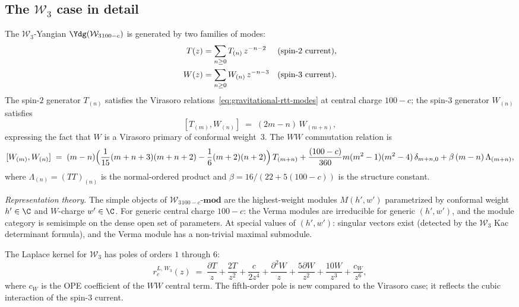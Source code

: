 \subsection{The $\mathcal{W}_3$ case in detail}

\begin{construction}
The $\mathcal{W}_3$-Yangian $\Ydg(\mathcal{W}_3{}_{100-c})$
is generated by two families of modes:
\begin{align}
T(z)&=\sum_{n\ge 0}T_{(n)}\,z^{-n-2}
 &&\text{(spin-$2$ current)}, \notag \\
W(z)&=\sum_{n\ge 0}W_{(n)}\,z^{-n-3}
 &&\text{(spin-$3$ current)}.
\end{align}
The spin-$2$ generator $T_{(n)}$ satisfies the Virasoro
relations~\eqref{eq:gravitational-rtt-modes} at central
charge $100-c$; the spin-$3$ generator $W_{(n)}$
satisfies
\begin{equation}
[T_{(m)},W_{(n)}]
\;=\;
(2m-n)\,W_{(m+n)},
\end{equation}
expressing the fact that $W$ is a Virasoro primary of
conformal weight~$3$. The $WW$ commutation relation is
\begin{equation}
[W_{(m)},W_{(n)}]
\;=\;
(m-n)\Bigl(
\frac{1}{15}(m+n+3)(m+n+2)
-\frac{1}{6}(m+2)(n+2)
\Bigr)\,T_{(m+n)}
+\frac{(100-c)}{360}m(m^2-1)(m^2-4)\,\delta_{m+n,0}
+\beta\,(m-n)\,\Lambda_{(m+n)},
\end{equation}
where $\Lambda_{(n)}=(TT)_{(n)}$ is the normal-ordered
product and $\beta=16/(22+5(100-c))$ is the structure
constant.

\emph{Representation theory.}
The simple objects of
$\mathcal{W}_3{}_{100-c}\text{-}\mathbf{mod}$
are the highest-weight modules $M(h',w')$
parametrized by conformal weight $h'\in\C$ and
$W$-charge $w'\in\C$. For generic central charge
$100-c$: the Verma modules are irreducible for generic
$(h',w')$, and the module category is semisimple on the
dense open set of parameters. At special values of
$(h',w')$: singular vectors exist (detected by the
$\mathcal{W}_3$ Kac determinant formula), and the
Verma module has a non-trivial maximal submodule.

The Laplace kernel for $\mathcal{W}_3$ has poles of orders
$1$ through $6$:
\begin{equation}
r_c^{L,\,W_3}(z)
\;=\;
\frac{\partial T}{z}
+\frac{2T}{z^2}
+\frac{c}{2z^4}
+\frac{\partial^2 W}{z}
+\frac{5\partial W}{z^2}
+\frac{10 W}{z^3}
+\frac{c_W}{z^6},
\end{equation}
where $c_W$ is the OPE coefficient of the $WW$ central
term. The fifth-order pole is new compared to the
Virasoro case; it reflects the cubic interaction of the
spin-$3$ current.
\end{construction}

